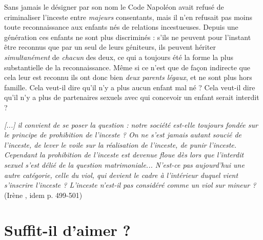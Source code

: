 Sans jamais le désigner par son nom le Code Napoléon avait refusé de criminaliser l'inceste entre \emph{majeurs} consentants, mais il n'en refusait pas moins toute reconnaissance aux enfants nés de relations incestueuses. Depuis une génération ces enfants ne sont plus discriminés : s'ils ne peuvent pour l'instant être reconnus que par un seul de leurs géniteurs, ils peuvent hériter \emph{simultanément}
 de \emph{chacun} des deux, ce qui a toujours été la forme la plus substantielle de la reconnaissance. Même si ce n'est que de façon indirecte que cela leur est reconnu ils ont donc bien  \emph{deux parents légaux}, et ne sont plus hors famille. 
 Cela veut-il dire qu'il n'y a plus aucun enfant mal né ? Cela veut-il dire qu'il n'y a plus de partenaires sexuels avec qui concevoir un enfant serait interdit ? 
 
 
 
 \begin{displayquote} 
\emph{[...] il convient de se poser la question : notre société est-elle toujours fondée sur le principe de prohibition de l'inceste ? On ne s'est jamais autant soucié de l'inceste, de lever le voile sur la réalisation de l'inceste, de punir l'inceste. Cependant la prohibition de l'inceste est devenue floue dès lors que l'interdit sexuel s'est délié de la question matrimoniale... N'est-ce pas aujourd'hui une autre catégorie, celle du viol, qui devient le cadre à l'intérieur duquel vient s'inscrire l'inceste ? L'inceste n'est-il pas considéré comme un viol sur mineur ?}
 (Irène , idem p. 499-501)
 \end{displayquote} 
 
 \section{Suffit-il d'aimer ?} 

